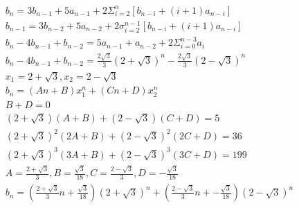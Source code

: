 \documentclass[a4paper]{article}
\begin{document}
\begin{enumerate}
\begin{solution}
\begin{align}
    b_n = 3b_{n-1}+5a_{n-1}+2\Sigma_{i=2}^n[b_{n-i}+(i+1)a_{n-i}]\\
    b_{n-1} = 3b_{n-2}+5a_{n-2}+2\sigma_{i=2}^{n-1}[b_{n-i}+(i+1)a_{n-i}]\\
    b_n - 4b_{n-1}+b_{n-2} = 5a_{n-1}+a_{n-2}+2\Sigma_{i=0}^{n-3}a_i\\
    b_n - 4b_{n-1}+b_{n-2} = \frac{2\sqrt{3}}{3} (2+\sqrt{3})^n - \frac{2\sqrt{3}}{3} (2-\sqrt{3})^n\\
    x_1 = 2+\sqrt{3}, x_2 = 2- \sqrt{3}\\
    b_n = (An+B)x_1^n+(Cn+D)x_2^n\\
    B+D=0\\
    (2+\sqrt{3})(A+B)+(2-\sqrt{3})(C+D)=5\\
    (2+\sqrt{3})^2(2A+B)+(2-\sqrt{3})^2(2C+D)=36\\
    (2+\sqrt{3})^3(3A+B)+(2-\sqrt{3})^3(3C+D)=199\\
    A =\frac{2+\sqrt{3}}{3}, B = \frac{\sqrt{3}}{18}, C=\frac{2-\sqrt{3}}{3}, D =- \frac{\sqrt{3}}{18}\\
    b_n = (\frac{2+\sqrt{3}}{3}n+\frac{\sqrt{3}}{18})(2+\sqrt{3})^n+(\frac{2-\sqrt{3}}{3}n+- \frac{\sqrt{3}}{18})(2- \sqrt{3})^n
\end{align}

\end{solution}


\end{enumerate}
\end{document}
